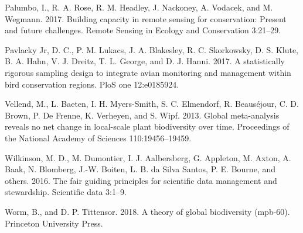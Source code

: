 \documentclass[
  12pt,
]{article}
\newlength{\cslhangindent}
\newenvironment{cslreferences}%
  {\setlength{\parindent}{0pt}%
  \everypar{\setlength{\hangindent}{\cslhangindent}}\ignorespaces}%
  {\par}
\begin{document}
\begin{cslreferences}
\leavevmode\hypertarget{ref-palumbo2017building}{}%
Palumbo, I., R. A. Rose, R. M. Headley, J. Nackoney, A. Vodacek, and M. Wegmann. 2017. Building capacity in remote sensing for conservation: Present and future challenges. Remote Sensing in Ecology and Conservation 3:21--29.

\leavevmode\hypertarget{ref-pavlacky2017statistically}{}%
Pavlacky Jr, D. C., P. M. Lukacs, J. A. Blakesley, R. C. Skorkowsky, D. S. Klute, B. A. Hahn, V. J. Dreitz, T. L. George, and D. J. Hanni. 2017. A statistically rigorous sampling design to integrate avian monitoring and management within bird conservation regions. PloS one 12:e0185924.

\leavevmode\hypertarget{ref-vellend2013global}{}%
Vellend, M., L. Baeten, I. H. Myers-Smith, S. C. Elmendorf, R. Beauséjour, C. D. Brown, P. De Frenne, K. Verheyen, and S. Wipf. 2013. Global meta-analysis reveals no net change in local-scale plant biodiversity over time. Proceedings of the National Academy of Sciences 110:19456--19459.

\leavevmode\hypertarget{ref-wilkinson2016fair}{}%
Wilkinson, M. D., M. Dumontier, I. J. Aalbersberg, G. Appleton, M. Axton, A. Baak, N. Blomberg, J.-W. Boiten, L. B. da Silva Santos, P. E. Bourne, and others. 2016. The fair guiding principles for scientific data management and stewardship. Scientific data 3:1--9.

\leavevmode\hypertarget{ref-worm2018theory}{}%
Worm, B., and D. P. Tittensor. 2018. A theory of global biodiversity (mpb-60). Princeton University Press.
\end{cslreferences}
\end{document}
